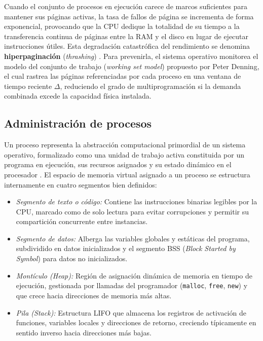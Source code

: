 \documentclass[12pt]{article}
\begin{document}
Cuando el conjunto de procesos en ejecución carece de marcos suficientes para mantener sus páginas activas, la tasa de fallos de página se incrementa de forma exponencial, provocando que la CPU dedique la totalidad de su tiempo a la transferencia continua de páginas entre la RAM y el disco en lugar de ejecutar instrucciones útiles. Esta degradación catastrófica del rendimiento se denomina \textbf{hiperpaginación} (\textit{thrashing}) \parencite[\S 8.2, pp.\ 384--387]{stallings2018operating}. Para prevenirla, el sistema operativo monitorea el modelo del conjunto de trabajo (\textit{working set model}) propuesto por Peter Denning, el cual rastrea las páginas referenciadas por cada proceso en una ventana de tiempo reciente $\Delta$, reduciendo el grado de multiprogramación si la demanda combinada excede la capacidad física instalada.

\subsection{Administración de procesos}\label{sec:administracionProcesos}

Un proceso representa la abstracción computacional primordial de un sistema operativo, formalizado como una unidad de trabajo activa constituida por un programa en ejecución, sus recursos asignados y su estado dinámico en el procesador \parencite[\S 3.1, p.\ 82]{silberschatz2006fundamentos}. El espacio de memoria virtual asignado a un proceso se estructura internamente en cuatro segmentos bien definidos:
\begin{itemize}[noitemsep, topsep=1pt]
    \item \textit{Segmento de texto o código:} Contiene las instrucciones binarias legibles por la CPU, marcado como de solo lectura para evitar corrupciones y permitir su compartición concurrente entre instancias.
    \item \textit{Segmento de datos:} Alberga las variables globales y estáticas del programa, subdividido en datos inicializados y el segmento BSS (\textit{Block Started by Symbol}) para datos no inicializados.
    \item \textit{Montículo (\textit{Heap}):} Región de asignación dinámica de memoria en tiempo de ejecución, gestionada por llamadas del programador (\texttt{malloc}, \texttt{free}, \texttt{new}) y que crece hacia direcciones de memoria más altas.
    \item \textit{Pila (\textit{Stack}):} Estructura LIFO que almacena los registros de activación de funciones, variables locales y direcciones de retorno, creciendo típicamente en sentido inverso hacia direcciones más bajas.
\end{itemize}
\end{document}

